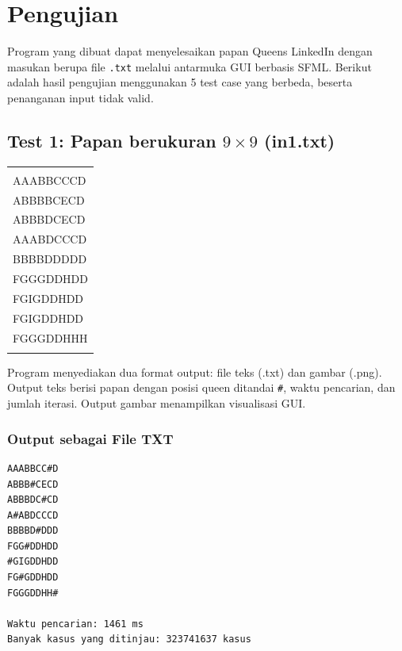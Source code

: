 \chapter{Pengujian}
Program yang dibuat dapat menyelesaikan papan Queens LinkedIn dengan masukan berupa file \texttt{.txt} melalui antarmuka GUI berbasis SFML. Berikut adalah hasil pengujian menggunakan 5 test case yang berbeda, beserta penanganan input tidak valid.

\section{Test 1: Papan berukuran $9\times 9$ (in1.txt)}
\begin{table}[H]
    \centering
    \begin{minipage}{0.45\textwidth}
        \centering
        \renewcommand{\arraystretch}{1.2}
        \setlength{\tabcolsep}{40pt}
        \begin{tabular}{|l|}
            \hline
            \phantom{text}\\
            AAABBCCCD\\
            ABBBBCECD\\
            ABBBDCECD\\
            AAABDCCCD\\
            BBBBDDDDD\\
            FGGGDDHDD\\
            FGIGDDHDD\\
            FGIGDDHDD\\
            FGGGDDHHH\\
            \phantom{text}\\
            \hline
        \end{tabular}
    \end{minipage}
\end{table}

Program menyediakan dua format output: file teks (.txt) dan gambar (.png). Output teks berisi papan dengan posisi queen ditandai \texttt{\#}, waktu pencarian, dan jumlah iterasi. Output gambar menampilkan visualisasi GUI.

\subsection*{Output sebagai File TXT}
\begin{lstlisting}[basicstyle=\ttfamily\small]
AAABBCC#D
ABBB#CECD
ABBBDC#CD
A#ABDCCCD
BBBBD#DDD
FGG#DDHDD
#GIGDDHDD
FG#GDDHDD
FGGGDDHH#

Waktu pencarian: 1461 ms
Banyak kasus yang ditinjau: 323741637 kasus
\end{lstlisting}


